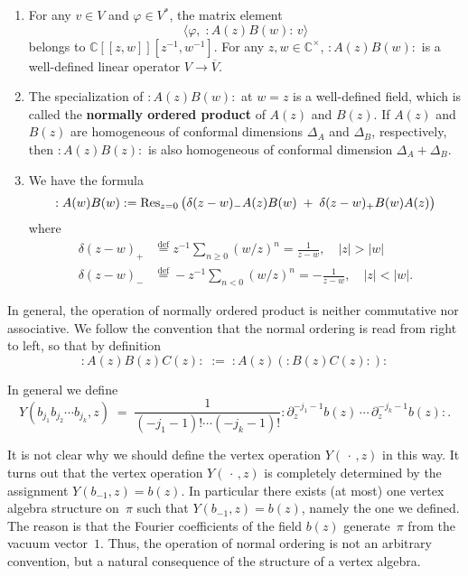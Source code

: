 \documentclass[12pt]{article}
\begin{document}
\begin{lemma}[2.2.3]
    \leavevmode
\begin{enumerate}
\item
For any $v\in V$ and $\varphi\in V^*$, the matrix element
\[
\langle \varphi,\; :A(z)B(w):\,v\rangle
\]
belongs to $\mathbb{C}[[z,w]][z^{-1},w^{-1}]$.
For any $z,w\in\mathbb{C}^\times$, $:A(z)B(w):$ is a well-defined linear operator $V\to\overline{V}$.

\item
The specialization of $:A(z)B(w):$ at $w=z$ is a well-defined field,
which is called the \textbf{normally ordered product} of $A(z)$ and $B(z)$.
If $A(z)$ and $B(z)$ are homogeneous of conformal dimensions
$\Delta_A$ and $\Delta_B$, respectively, then
$:A(z)B(z):$ is also homogeneous of conformal dimension $\Delta_A+\Delta_B$.
\item We have the formula
\[
:A(w)B(w):
= \operatorname{Res}_{z=0}\big(
\delta(z-w)_-A(z)B(w)
\;+\;
\delta(z-w)_+B(w)A(z)
\big)
\] where \begin{align*}
\delta(z-w)_+ &\stackrel{\mathrm{def}}{=} z^{-1}\sum_{n\ge0} (w/z)^n = \frac{1}{z-w}, \quad |z|>|w| \\
\delta(z-w)_- &\stackrel{\mathrm{def}}{=} -z^{-1}\sum_{n<0} (w/z)^n = -\frac{1}{z-w}, \quad |z|<|w|.
\end{align*}
\end{enumerate}
\end{lemma}


\begin{remark}
In general, the operation of normally ordered product is neither commutative nor associative.
We follow the convention that the normal ordering is read from right to left,
so that by definition
\[
:A(z)B(z)C(z):
\;:=\;
:A(z)(:B(z)C(z):):
\]
\end{remark}

In general we define
\begin{equation}\label{2.2.3}
Y(b_{j_1} b_{j_2} \cdots b_{j_k}, z)
\;=\;
\frac{1}{(-j_1-1)!\cdots(-j_k-1)!}
:\partial_z^{-j_1-1} b(z)\,\cdots\,\partial_z^{-j_k-1} b(z):.
\end{equation}

It is not clear why we should define the vertex operation $Y(\,\cdot\,,z)$ in this way.
It turns out that the vertex operation $Y(\,\cdot\,,z)$
is completely determined by the assignment $Y(b_{-1},z)=b(z)$. In particular there exists (at most) one vertex algebra structure on~$\pi$
such that $Y(b_{-1},z)=b(z)$, namely the one we defined.
The reason is that the Fourier coefficients of the field $b(z)$ generate~$\pi$
from the vacuum vector~$1$.
Thus, the operation of normal ordering is not an arbitrary convention, but a natural consequence of the structure of a vertex algebra.
\end{document}
